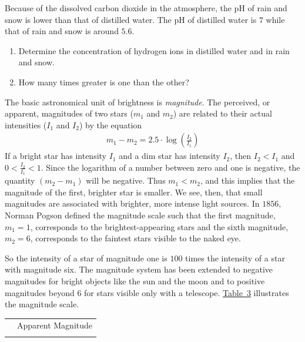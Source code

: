 \documentclass[10pt,]{book}
\theoremstyle{ptxdefinitionnotitle}
\theoremstyle{ptxdefinitiontitle}
\theoremstyle{ptxdefinitionnotitle}
\theoremstyle{ptxdefinitiontitle}
\theoremstyle{ptxdefinitionnotitle}
\theoremstyle{ptxdefinitiontitle}
\numberwithin{equation}{section}
\newcommand{\hrulemedium}{\noalign{\hrule height 0.07em}}
\newcommand{\hrulethick} {\noalign{\hrule height 0.11em}}
\newcommand{\lt}{<}
\begin{document}
\begin{divisionexercise}{7}\hypertarget{exercise-89}{}
\hypertarget{p-319}{}%
Because of the dissolved carbon dioxide in the atmosphere, the pH of rain and snow is lower than that of distilled water.   The pH of distilled water is \(7\) while that of rain and snow is around \(5.6\). \leavevmode%
\begin{enumerate}[label=(\alph*)]
\item\hypertarget{li-233}{}Determine the concentration of hydrogen ions in distilled water and in rain and snow.%
\item\hypertarget{li-234}{}How many times greater is one than the other?%
\end{enumerate}
%
\end{divisionexercise}%
\begin{divisionexercise}{8}\hypertarget{exercise-90}{}
\hypertarget{p-320}{}%
The basic astronomical unit of brightness is \emph{magnitude}.  The perceived, or apparent, magnitudes of two stars (\(m_1\) and \(m_2\)) are related to their actual intensities (\(I_1\) and \(I_2\)) by the equation%
\begin{gather*}
m_1 - m_2 = 2.5 \cdot \log \left( \frac{I_2}{I_1} \right)
\end{gather*}
If a bright star has intensity \(I_1\) and a dim star has intensity \(I_2\), then \(I_2 \lt I_1\) and \(0 \lt \frac{I_2}{I_1} \lt 1\). Since the logarithm of a number between zero and one is negative, the quantity \(\left( m_2 - m_1 \right)\) will be negative. Thus \(m_1 \lt m_2\), and this implies that the magnitude of the first, brighter star is smaller. We see, 	then, that small magnitudes are associated with brighter, more intense light sources. In \(1856\), Norman Pogson defined the magnitude scale such that the first magnitude, \(m_1 = 1\), corresponds to the brightest-appearing stars and the sixth magnitude, \(m_2 = 6\), corresponds to the faintest stars visible to the naked eye.%
\par
\hypertarget{p-321}{}%
So the intensity of a star of magnitude one is \(100\) times the intensity of a star with magnitude six. The magnitude system has been extended to negative magnitudes for bright objects like the sun and the moon and to positive magnitudes beyond \(6\) for stars visible only with a telescope.  \hyperref[star-chart]{Table~3} illustrates the magnitude scale.%
\begin{table}
\centering
\begin{tabular}{cc}\hrulethick
\multicolumn{1}{l}{Object}&Apparent Magnitude\tabularnewline\hrulemedium

\end{tabular}
\end{table}
\end{divisionexercise}
\end{document}
